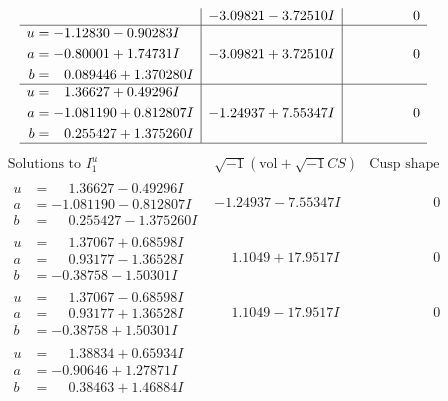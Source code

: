 \documentclass[1p]{elsarticle_modified}
\theoremstyle{definition}
\newcommand{\I}{\sqrt{-1}}
\begin{document}
$$\begin{array}{c|c|c}
 & -3.09821 - 3.72510 I & \phantom{-0.000000 } 0 \\ \hline\begin{aligned}
u &= -1.12830 - 0.90283 I \\
a &= -0.80001 + 1.74731 I \\
b &= \phantom{-}0.089446 + 1.370280 I\end{aligned}
 & -3.09821 + 3.72510 I & \phantom{-0.000000 } 0 \\ \hline\begin{aligned}
u &= \phantom{-}1.36627 + 0.49296 I \\
a &= -1.081190 + 0.812807 I \\
b &= \phantom{-}0.255427 + 1.375260 I\end{aligned}
 & -1.24937 + 7.55347 I & \phantom{-0.000000 } 0\\
 \hline 
 \end{array}$$\newpage$$\begin{array}{c|c|c}  
\text{Solutions to }I^u_{1}& \I (\text{vol} + \sqrt{-1}CS) & \text{Cusp shape}\\
 \hline 
\begin{aligned}
u &= \phantom{-}1.36627 - 0.49296 I \\
a &= -1.081190 - 0.812807 I \\
b &= \phantom{-}0.255427 - 1.375260 I\end{aligned}
 & -1.24937 - 7.55347 I & \phantom{-0.000000 } 0 \\ \hline\begin{aligned}
u &= \phantom{-}1.37067 + 0.68598 I \\
a &= \phantom{-}0.93177 - 1.36528 I \\
b &= -0.38758 - 1.50301 I\end{aligned}
 & \phantom{-}1.1049 + 17.9517 I & \phantom{-0.000000 } 0 \\ \hline\begin{aligned}
u &= \phantom{-}1.37067 - 0.68598 I \\
a &= \phantom{-}0.93177 + 1.36528 I \\
b &= -0.38758 + 1.50301 I\end{aligned}
 & \phantom{-}1.1049 - 17.9517 I & \phantom{-0.000000 } 0 \\ \hline\begin{aligned}
u &= \phantom{-}1.38834 + 0.65934 I \\
a &= -0.90646 + 1.27871 I \\
b &= \phantom{-}0.38463 + 1.46884 I\end{aligned}

\end{array}$$
\end{document}

